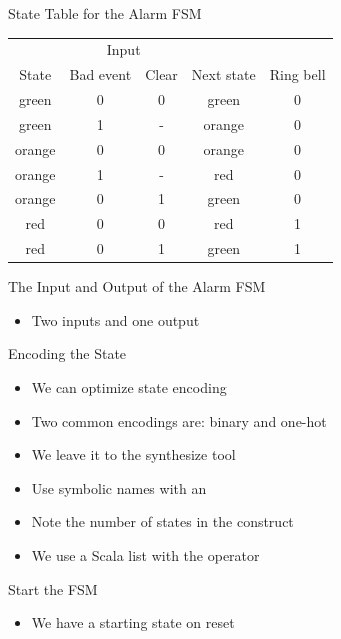 \begin{frame}[fragile]{State Table for the Alarm FSM}
\begin{table}
\centering
\begin{tabular}{ccccc}
\toprule
& \multicolumn{2}{c}{Input} \\
\cmidrule{2-3}
State &  Bad event & Clear & Next state & Ring bell \\
\midrule
green & 0 & 0 & green & 0 \\
green & 1 & - & orange & 0 \\
orange & 0 & 0 & orange & 0 \\
orange & 1 & - & red & 0 \\
orange & 0 & 1 & green & 0 \\
red & 0 & 0 & red & 1 \\
red & 0 & 1 & green & 1 \\
\bottomrule
\end{tabular}
\label{tab:state:table}
\end{table}
\end{frame}

\begin{frame}[fragile]{The Input and Output of the Alarm FSM}
\begin{itemize}
\item Two inputs and one output
\end{itemize}
\end{frame}

\begin{frame}[fragile]{Encoding the State}
\begin{itemize}
\item We can optimize state encoding
\item Two common encodings are: binary and one-hot
\item We leave it to the synthesize tool
\item Use symbolic names with an 
\item Note the number of states in the  construct
\item We use a Scala list with the \code{::} operator
\end{itemize}
\end{frame}

\begin{frame}[fragile]{Start the FSM}
\begin{itemize}
\item We have a starting state on reset
\end{itemize}
\end{frame}


